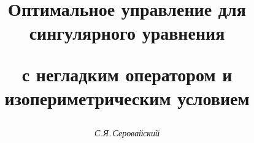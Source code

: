 

 


% 


 


\newcommand{\mes}{\operatorname{mes}} 


\newcommand{\Div}{\operatorname{div}} 


\newcommand{\tts}[1]{} 


 




\setcounter{page}{58} 












 


\author{\it С.Я.\,Серовайский} 




\title{Оптимальное управление для сингулярного уравнения 


с негладким оператором и изопериметрическим условием} 


 


\date{} 




\pagestyle{plain} %


 




\maketitle 


